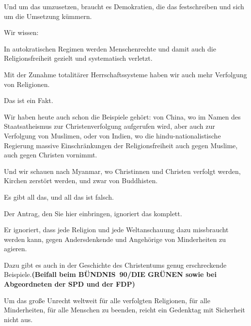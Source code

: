 \documentclass{article}
\begin{document}
\colorbox{CustomColor12}{\parbox{\linewidth}{Und um das umzusetzen, braucht es Demokratien, die das festschreiben und sich um die Umsetzung kümmern.}}

\colorbox{CustomColor7}{\parbox{\linewidth}{Wir wissen:}}

\colorbox{CustomColor13}{\parbox{\linewidth}{In autokratischen Regimen werden Menschenrechte und damit auch die Religionsfreiheit gezielt und systematisch verletzt.}}

\colorbox{CustomColor14}{\parbox{\linewidth}{Mit der Zunahme totalitärer Herrschaftssysteme haben wir auch mehr Verfolgung von Religionen.}}

\colorbox{CustomColor0}{\parbox{\linewidth}{Das ist ein Fakt.}}

\colorbox{CustomColor15}{\parbox{\linewidth}{Wir haben heute auch schon die Beispiele gehört: von China, wo im Namen des Staatsatheismus zur Christenverfolgung aufgerufen wird, aber auch zur Verfolgung von Muslimen, oder von Indien, wo die hindu-nationalistische Regierung massive Einschränkungen der Religionsfreiheit auch gegen Muslime, auch gegen Christen vornimmt.}}

\colorbox{CustomColor16}{\parbox{\linewidth}{Und wir schauen nach Myanmar, wo Christinnen und Christen verfolgt werden, Kirchen zerstört werden, und zwar von Buddhisten.}}

\colorbox{CustomColor14}{\parbox{\linewidth}{Es gibt all das, und all das ist falsch.}}

\colorbox{CustomColor0}{\parbox{\linewidth}{Der Antrag, den Sie hier einbringen, ignoriert das komplett.}}

\colorbox{CustomColor17}{\parbox{\linewidth}{Er ignoriert, dass jede Religion und jede Weltanschauung dazu missbraucht werden kann, gegen Andersdenkende und Angehörige von Minderheiten zu agieren.}}

\colorbox{CustomColor18}{\parbox{\linewidth}{Dazu gibt es auch in der Geschichte des Christentums genug erschreckende Beispiele.\textbf{(Beifall beim BÜNDNIS 90/DIE GRÜNEN sowie bei Abgeordneten der SPD und der FDP)}}}

\colorbox{CustomColor19}{\parbox{\linewidth}{Um das große Unrecht weltweit für alle verfolgten Religionen, für alle Minderheiten, für alle Menschen zu beenden, reicht ein Gedenktag mit Sicherheit nicht aus.}}
\end{document}
